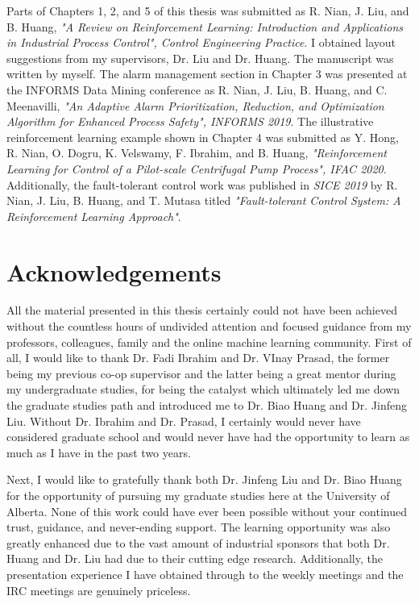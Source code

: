 \documentclass[12pt]{report}
\begin{document}
Parts of Chapters 1, 2, and 5 of this thesis was submitted as R. Nian, J. Liu, and B. Huang, \textit{"A Review on Reinforcement Learning: Introduction and Applications in Industrial Process Control", Control Engineering Practice}.  I obtained layout suggestions from my supervisors, Dr. Liu and Dr. Huang.  The manuscript was written by myself. The alarm management section in Chapter 3 was presented at the INFORMS Data Mining conference as R. Nian, J. Liu, B. Huang, and C. Meenavilli, \textit{"An Adaptive Alarm Prioritization, Reduction, and Optimization Algorithm for Enhanced Process Safety", INFORMS 2019}. The illustrative reinforcement learning example shown in Chapter 4 was submitted as Y. Hong, R. Nian, O. Dogru, K. Velswamy, F. Ibrahim, and B. Huang, \textit{"Reinforcement Learning for Control of a Pilot-scale Centrifugal Pump Process", IFAC 2020}. Additionally, the fault-tolerant control work was published in \textit{SICE 2019} by R. Nian, J. Liu, B. Huang, and T. Mutasa titled \textit{"Fault-tolerant Control System: A Reinforcement Learning Approach"}.

\tableofcontents
\listoffigures
\listoftables

\chapter*{Acknowledgements}
All the material presented in this thesis certainly could not have been achieved without the countless hours of undivided attention and focused guidance from my professors, colleagues, family and the online machine learning community. First of all, I would like to thank Dr. Fadi Ibrahim and Dr. VInay Prasad, the former being my previous co-op supervisor and the latter being a great mentor during my undergraduate studies, for being the catalyst which ultimately led me down the graduate studies path and introduced me to Dr. Biao Huang and Dr. Jinfeng Liu. Without Dr. Ibrahim and Dr. Prasad, I certainly would never have considered graduate school and would never have had the opportunity to learn as much as I have in the past two years.  

Next, I would like to gratefully thank both Dr. Jinfeng Liu and Dr. Biao Huang for the opportunity of pursuing my graduate studies here at the University of Alberta.  None of this work could have ever been possible without your continued trust, guidance, and never-ending support.  The learning opportunity was also greatly enhanced due to the vast amount of industrial sponsors that both Dr. Huang and Dr. Liu had due to their cutting edge research.  Additionally, the presentation experience I have obtained through to the weekly meetings and the IRC meetings are genuinely priceless.
\end{document}
